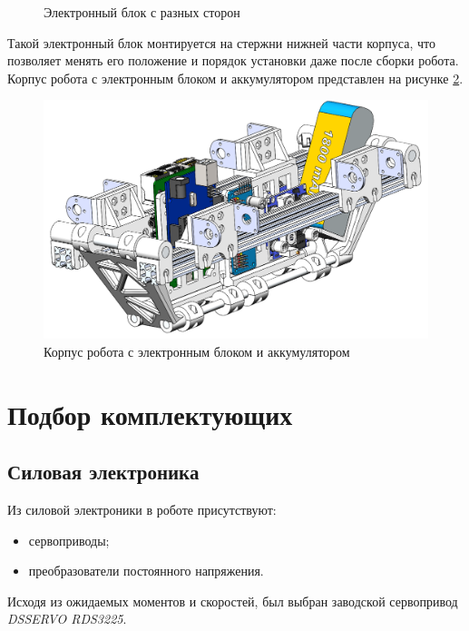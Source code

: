 \begin{figure}[ht]
    \caption{Электронный блок с разных сторон}
    \label{fig:electro_blok}
\end{figure}

Такой электронный блок монтируется на стержни нижней части корпуса, что позволяет менять его положение и порядок установки даже после сборки робота. Корпус робота с электронным блоком и аккумулятором представлен на рисунке \ref{fig:full_body}.
\begin{figure}[h]
    \centering
    \includegraphics[scale=0.45]{chapter_mechanics_construction/figure19.png}
    \caption{Корпус робота с электронным блоком и аккумулятором}
    \label{fig:full_body}
\end{figure}

\section{Подбор комплектующих}
\subsection{Силовая электроника}
Из силовой электроники в роботе присутствуют:
\begin{itemize}
    \item сервоприводы;
    \item преобразователи постоянного напряжения.
\end{itemize}

Исходя из ожидаемых моментов и скоростей, был выбран заводской сервопривод \textit{DSSERVO RDS3225}.

